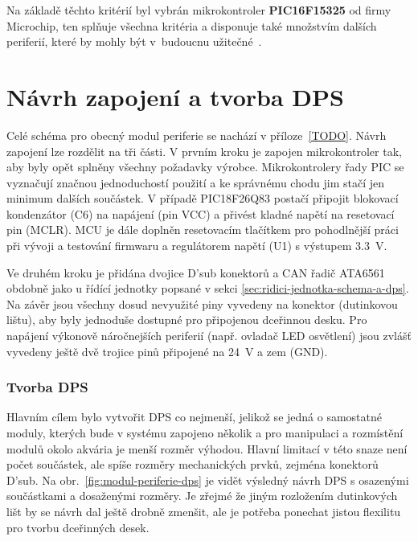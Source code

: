        Na základě těchto kritérií byl vybrán mikrokontroler \textbf{PIC16F15325} od firmy Microchip, ten splňuje všechna kritéria a disponuje také množstvím dalších periferií, které by mohly být v~budoucnu užitečné~\cite{PIC18F26Q83}.

    \section{Návrh zapojení a tvorba DPS}
        Celé schéma pro obecný modul periferie se nachází v příloze~\ref{TODO}. Návrh zapojení lze rozdělit na tři části. V prvním kroku je zapojen mikrokontroler tak, aby byly opět splněny všechny požadavky výrobce. Mikrokontrolery řady PIC se vyznačují značnou jednoduchostí použití a ke správnému chodu jim stačí jen minimum dalších součástek. V případě PIC18F26Q83 postačí připojit blokovací kondenzátor (C6) na napájení (pin VCC) a přivést kladné napětí na resetovací pin (MCLR). MCU je dále doplněn resetovacím tlačítkem pro pohodlnější práci při vývoji a testování firmwaru a regulátorem napětí (U1) s výstupem \qty{3.3}{V}. 

        Ve druhém kroku je přidána dvojice D'sub konektorů a CAN řadič ATA6561 obdobně jako u řídící jednotky popsané v sekci \ref{sec:ridici-jednotka-schema-a-dps}. Na závěr jsou všechny dosud nevyužité piny vyvedeny na konektor (dutinkovou lištu), aby byly jednoduše dostupné pro připojenou dceřinnou desku. Pro napájení výkonově náročnejších periferií (např. ovladač LED osvětlení) jsou zvlášť vyvedeny ještě dvě trojice pinů připojené na \qty{24}{V} a zem (GND).

        \subsubsection{Tvorba DPS}
        Hlavním cílem bylo vytvořit DPS co nejmenší, jelikož se jedná o samostatné moduly, kterých bude v systému zapojeno několik a pro manipulaci a rozmístění modulů okolo akvária je menší rozměr výhodou. Hlavní limitací v této snaze není počet součástek, ale spíše rozměry mechanických prvků, zejména konektorů D'sub. Na obr.~\ref{fig:modul-periferie-dps} je vidět výsledný návrh DPS s osazenými součástkami a dosaženými rozměry. Je zřejmé že jiným rozložením dutinkových lišt by se návrh dal ještě drobně zmenšit, ale je potřeba ponechat jistou flexilitu pro tvorbu dceřinných desek.

